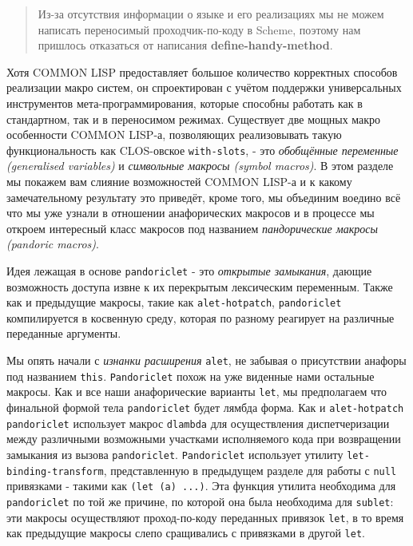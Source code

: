 \begin{quote}Из-за отсутствия информации о языке и его реализациях мы не можем написать переносимый проходчик-по-коду в Scheme, поэтому нам пришлось отказаться от написания \textbf{de\-fine\--\-han\-dy\--\-me\-thod}.\end{quote}

Хотя COMMON LISP предоставляет большое количество корректных способов реализации макро систем, он спроектирован с учётом поддержки универсальных инструментов мета-программирования, которые способны работать как в стандартном, так и в переносимом режимах. Существует две мощных макро особенности COMMON LISP-а, позволяющих реализовывать такую функциональность как CLOS-овское \verb"with-slots", - это \emph{обобщённые переменные (generalised variables)} и \emph{символьные макросы (symbol macros)}. В этом разделе мы покажем вам слияние возможностей COMMON LISP-а и к какому замечательному результату это приведёт, кроме того, мы объединим воедино всё что мы уже узнали в отношении анафорических макросов и в процессе мы откроем интересный класс макросов под названием \emph{пандорические макросы (pandoric macros)}.

Идея лежащая в основе \verb"pandoriclet" - это \emph{открытые замыкания}, дающие возможность доступа извне к их перекрытым лексическим переменным. Также как и предыдущие макросы, такие как \verb"alet-hotpatch", \verb"pandoriclet" компилируется в косвенную среду, которая по разному реагирует на различные переданные аргументы.

Мы опять начали с \emph{изнанки расширения} \verb"alet", не забывая о присутствии анафоры под названием \verb"this". \verb"Pandoriclet" похож на уже виденные нами остальные макросы. Как и все наши анафорические варианты \verb"let", мы предполагаем что финальной формой тела \verb"pandoriclet" будет лямбда форма. Как и \verb"alet-hotpatch" \verb"pandoriclet" использует макрос \verb"dlambda" для осуществления диспетчеризации между различными возможными участками исполняемого кода при возвращении замыкания из вызова \verb"pandoriclet". \verb"Pandoriclet" использует утилиту \verb"let-binding-transform", представленную в предыдущем разделе для работы с \verb"null" привязками - такими как \verb"(let (a) ...)". Эта функция утилита необходима для \verb"pandoriclet" по той же причине, по которой она была необходима для \verb"sublet": эти макросы осуществляют проход-по-коду переданных привязок \verb"let", в то время как предыдущие макросы слепо сращивались с привязками в другой \verb"let".

